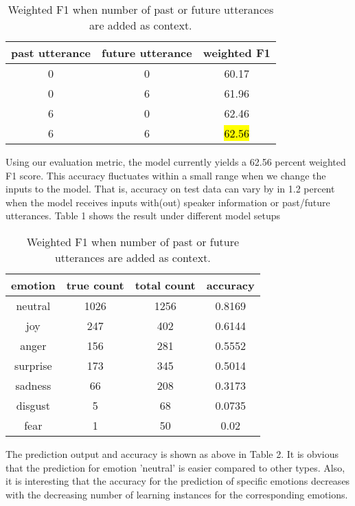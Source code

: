 \documentclass[11pt]{article}
\begin{document}
\begin{table}[hbt]
  \centering
  \begin{tabular}{c|c|c}
    past utterance & future utterance & weighted F1 \\
    \hline
    0 & 0 & 60.17 \\
    \hline
    0 & 6 & 61.96 \\
    \hline
    6 & 0 & 62.46 \\
    \hline
    6 & 6 & \hl{62.56} \\
  \end{tabular}
  \caption{Weighted F1 when number of past or future utterances are added as context.}
\end{table}

Using our evaluation metric, the model currently yields a 62.56 percent weighted F1 score. This accuracy fluctuates within a small range when we change the inputs to the model. That is, accuracy on test data can vary by in 1.2 percent when the model receives inputs with(out) speaker information or past/future utterances. Table 1 shows the result under different model setups

\begin{table}[hbt]
  \centering
  \begin{tabular}{c|c|c|c}
    emotion & true count & total count & accuracy \\
    \hline
    neutral & 1026 & 1256 & 0.8169 \\
    \hline
    joy & 247 & 402 & 0.6144 \\
    \hline
    anger & 156 & 281 & 0.5552 \\
    \hline
    surprise & 173 & 345 & 0.5014 \\
    \hline
    sadness & 66 & 208 & 0.3173 \\
    \hline
    disgust & 5 & 68 & 0.0735 \\
    \hline
    fear & 1 & 50 & 0.02 \\
  \end{tabular}
  \caption{Weighted F1 when number of past or future utterances are added as context.}
\end{table}

The prediction output and accuracy is shown as above in Table 2. It is obvious that the prediction for emotion 'neutral' is easier compared to other types. Also, it is interesting that the accuracy for the prediction of specific emotions decreases with the decreasing number of learning instances for the corresponding emotions. 
\end{document}
